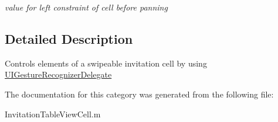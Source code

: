 \begin{DoxyCompactItemize}
\begin{DoxyCompactList}\small\item\em value for left constraint of cell before panning \end{DoxyCompactList}\end{DoxyCompactItemize}


\subsection{Detailed Description}
Controls elements of a swipeable invitation cell by using \hyperlink{class_u_i_gesture_recognizer_delegate-p}{U\+I\+Gesture\+Recognizer\+Delegate} 

The documentation for this category was generated from the following file\+:\begin{DoxyCompactItemize}
\item 
Invitation\+Table\+View\+Cell.\+m\end{DoxyCompactItemize}
